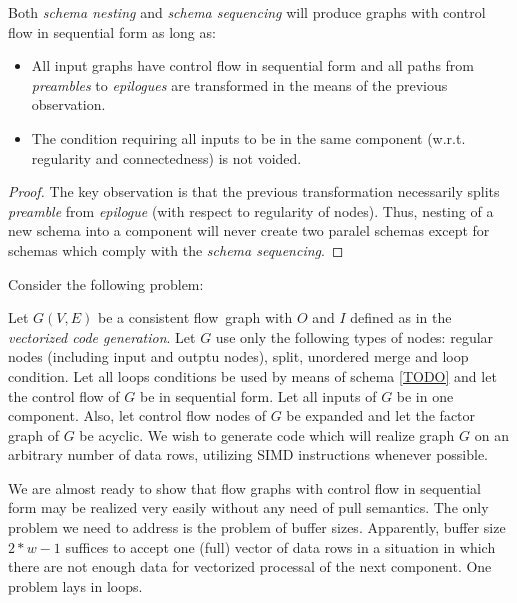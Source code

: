 \begin{observation}
  Both \emph{schema nesting} and \emph{schema sequencing} will produce graphs with control flow in sequential form as long as:
  \begin{itemize}
    \item All input graphs have control flow in sequential form and all paths from \emph{preambles} to \emph{epilogues} are transformed in the means of the previous observation.
    \item The condition requiring all inputs to be in the same component (w.r.t. regularity and connectedness) is not voided.
  \end {itemize} 
  \begin{proof} 
  The key observation is that the previous transformation necessarily splits \emph{preamble} from \emph{epilogue} (with respect to regularity of nodes). Thus, nesting of a new schema into a component will never create two paralel schemas except for schemas which comply with the \emph{schema sequencing}.
  \end{proof}
\end{observation}


Consider the following problem:

\begin{problem}
  Let $G(V,E)$ be a consistent flow~graph with $O$ and $I$ defined as in the \emph{vectorized code generation}. Let $G$ use only the following types of nodes: regular nodes (including input and outptu nodes), split, unordered merge and loop condition. Let all loops conditions be used by means of schema \ref{TODO} and let the control flow of $G$ be in sequential form. Let all inputs of $G$ be in one component. Also, let control flow nodes of $G$ be expanded and let the factor graph of $G$ be acyclic. We wish to generate code which will realize graph $G$ on an arbitrary number of data rows, utilizing SIMD instructions whenever possible. 
\end{problem}

  We are almost ready to show that flow graphs with control flow in sequential form may be realized very easily without any need of pull semantics. The only problem we need to address is the problem of buffer sizes. Apparently, buffer size $2*w-1$ suffices to accept one (full) vector of data rows in a situation in which there are not enough data for vectorized processal of the next component. One problem lays in loops. 

